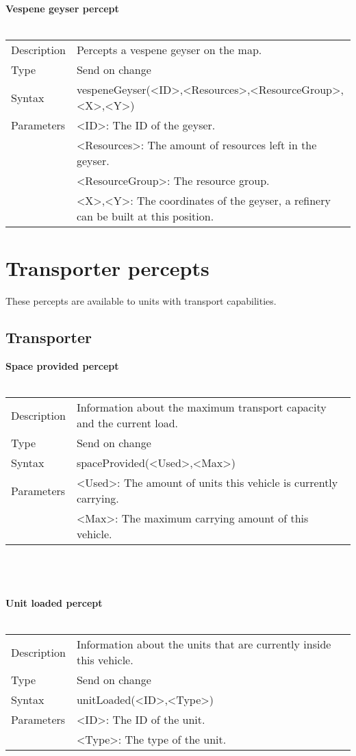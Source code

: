 \documentclass[english,11pt]{report}
\begin{document}
\\
\\
\textbf{Vespene geyser percept}\\
\\
\begin{tabularx}{\textwidth}{lX}
 Description & Percepts a vespene geyser on the map. \\
 Type & Send on change \\
 Syntax & vespeneGeyser(<ID>,<Resources>,<ResourceGroup>,<X>,<Y>) \\
 Parameters &   <ID>: The ID of the geyser.\\
            &   <Resources>: The amount of resources left in the geyser.\\
            &   <ResourceGroup>: The resource group.\\
            &   <X>,<Y>: The coordinates of the geyser, a refinery can be built at this position.
\end{tabularx}

\newpage
\section{Transporter percepts}
These percepts are available to units with transport capabilities.
\subsection{Transporter}
\textbf{Space provided percept}\\
\\
\begin{tabularx}{\textwidth}{lX}
 Description & Information about the maximum transport capacity and the current load. \\
 Type & Send on change \\
 Syntax & spaceProvided(<Used>,<Max>) \\
 Parameters &   <Used>: The amount of units this vehicle is currently carrying.\\
            &   <Max>: The maximum carrying amount of this vehicle.
\end{tabularx}\\
\\
\\
\textbf{Unit loaded percept}\\
\\
\begin{tabularx}{\textwidth}{lX}
 Description & Information about the units that are currently inside this vehicle. \\
 Type & Send on change \\
 Syntax & unitLoaded(<ID>,<Type>) \\
 Parameters &   <ID>: The ID of the unit.\\
            &   <Type>: The type of the unit.
\end{tabularx}
\end{document}
